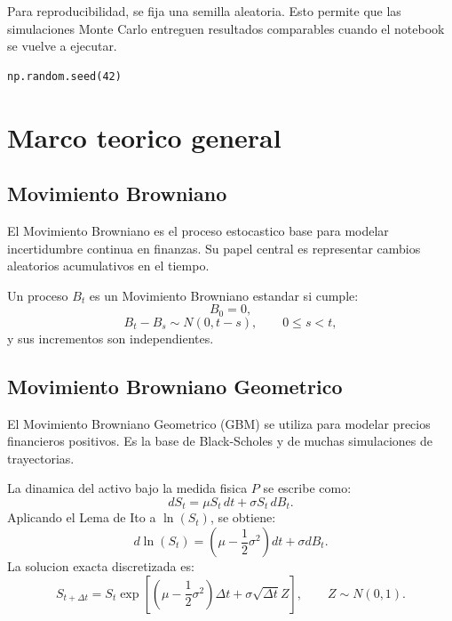 \documentclass[12pt,a4paper]{article}
\begin{document}
\begin{markdowncell}
Para reproducibilidad, se fija una semilla aleatoria. Esto permite que las simulaciones Monte Carlo entreguen resultados comparables cuando el notebook se vuelve a ejecutar.
\end{markdowncell}

\begin{lstlisting}[style=pythonstyle]
np.random.seed(42)
\end{lstlisting}

\section{Marco teorico general}

\subsection{Movimiento Browniano}

\begin{markdowncell}
El Movimiento Browniano es el proceso estocastico base para modelar incertidumbre continua en finanzas. Su papel central es representar cambios aleatorios acumulativos en el tiempo.
\end{markdowncell}

\begin{latexcell}
Un proceso \(B_t\) es un Movimiento Browniano estandar si cumple:
\[
B_0 = 0,
\]
\[
B_t - B_s \sim N(0,t-s), \qquad 0 \leq s < t,
\]
y sus incrementos son independientes.
\end{latexcell}

\subsection{Movimiento Browniano Geometrico}

\begin{markdowncell}
El Movimiento Browniano Geometrico (GBM) se utiliza para modelar precios financieros positivos. Es la base de Black-Scholes y de muchas simulaciones de trayectorias.
\end{markdowncell}

\begin{latexcell}
La dinamica del activo bajo la medida fisica \(P\) se escribe como:
\[
dS_t = \mu S_t\,dt + \sigma S_t\,dB_t.
\]
Aplicando el Lema de Ito a \(\ln(S_t)\), se obtiene:
\[
d\ln(S_t)=\left(\mu-\frac{1}{2}\sigma^2\right)dt+\sigma dB_t.
\]
La solucion exacta discretizada es:
\[
S_{t+\Delta t}
=
S_t
\exp\left[
\left(\mu-\frac{1}{2}\sigma^2\right)\Delta t
+
\sigma \sqrt{\Delta t}Z
\right],
\qquad Z\sim N(0,1).
\]
\end{latexcell}
\end{document}
